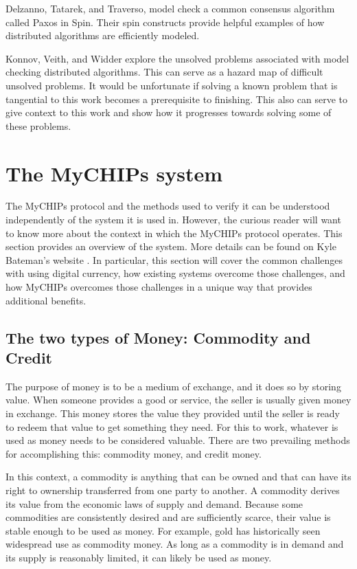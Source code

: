 \documentclass[runningheads]{llncs}
\begin{document}
 Delzanno, Tatarek, and Traverso, model check a common consensus algorithm called Paxos in Spin. Their spin constructs provide helpful examples of how distributed algorithms are efficiently modeled.\cite{Delzanno_2014}
 
 Konnov, Veith, and Widder explore the unsolved problems associated with model checking distributed algorithms. This can serve as a hazard map of difficult unsolved problems. It would be unfortunate if solving a known problem that is tangential to this work becomes a prerequisite to finishing. This also can serve to give context to this work and show how it progresses towards solving some of these problems.\cite{Konnov}




\appendix

\section{The MyCHIPs system}
\label{apdx:mychips}
The MyCHIPs protocol and the methods used to verify it can be understood independently of the system it is used in. However, the curious reader will want to know more about the context in which the MyCHIPs protocol operates. This section provides an overview of the system. More details can be found on Kyle Bateman's website \cite{bateman_myCHIPs}. 
In particular, this section will cover the common challenges with using digital currency, how existing systems overcome those challenges, and how MyCHIPs overcomes those challenges in a unique way that provides additional benefits. 

\subsection{The two types of Money: Commodity and Credit}
The purpose of money is to be a medium of exchange, and it does so by storing value. When someone provides a good or service, the seller is usually given money in exchange. This money stores the value they provided until the seller is ready to redeem that value to get something they need.
For this to work, whatever is used as money needs to be considered valuable. There are two prevailing methods for accomplishing this: commodity money, and credit money. 

In this context, a commodity is anything that can be owned and that can have its right to ownership transferred from one party to another. A commodity derives its value from the economic laws of supply and demand. Because some commodities are consistently desired and are sufficiently scarce, their value is stable enough to be used as money. For example, gold has historically seen widespread use as commodity money. As long as a commodity is in demand and its supply is reasonably limited, it can likely be used as money.
\end{document}
